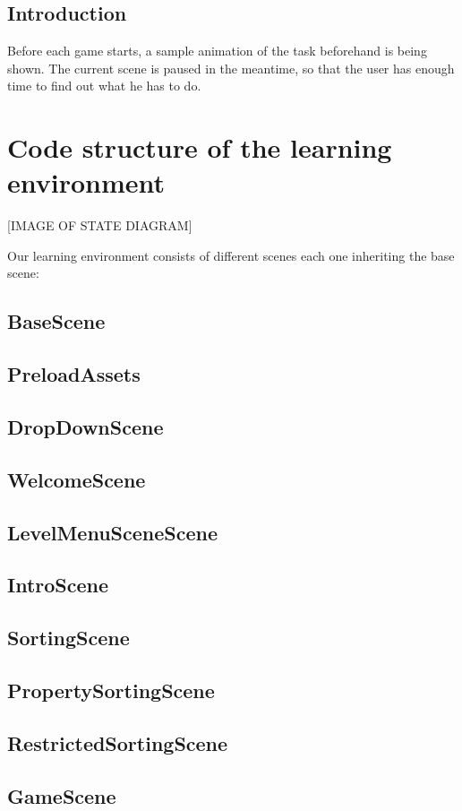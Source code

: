 \subsection{Introduction}
Before each game starts, a sample animation of the task beforehand is being shown.
The current scene is paused in the meantime, so that the user has enough time to find out what he has to do.

\section{Code structure of the learning environment}
[IMAGE OF STATE DIAGRAM]

Our learning environment consists of different scenes each one inheriting the base scene:
\subsection{BaseScene}
\subsection{PreloadAssets}
\subsection{DropDownScene}
\subsection{WelcomeScene}
\subsection{LevelMenuSceneScene}
\subsection{IntroScene}
\subsection{SortingScene}
\subsection{PropertySortingScene}
\subsection{RestrictedSortingScene}
\subsection{GameScene}
